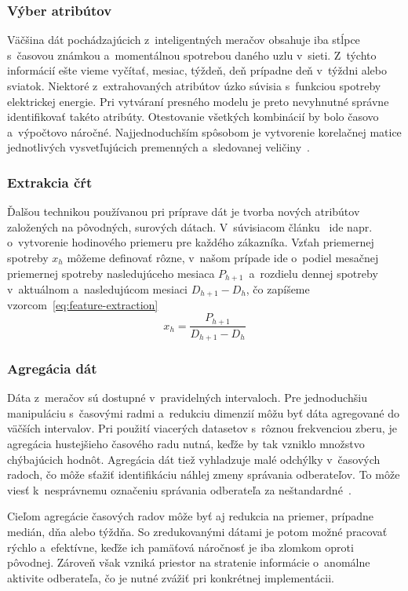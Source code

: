 \documentclass[a4paper,twoside,slovak,12pt,appendix]{article}
\begin{document}
\subsubsection{Výber atribútov}
Väčšina dát pochádzajúcich z~inteligentných meračov obsahuje iba stĺpce
s~časovou známkou a~momentálnou spotrebou daného uzlu v~sieti. Z~týchto
informácií ešte vieme vyčítať, mesiac, týždeň, deň prípadne deň v~týždni alebo
sviatok. Niektoré z~extrahovaných atribútov úzko súvisia s~funkciou spotreby
elektrickej energie. Pri vytváraní presného modelu je preto nevyhnutné správne
identifikovať takéto atribúty. Otestovanie všetkých kombinácií by bolo časovo
a~výpočtovo náročné. Najjednoduchším spôsobom je vytvorenie korelačnej matice
jednotlivých vysvetľujúcich premenných a~sledovanej veličiny~\cite{Cody2015}.

\subsubsection{Extrakcia čŕt}
Ďalšou technikou používanou pri príprave dát je tvorba nových atribútov
založených na pôvodných, surových dátach. V~súvisiacom článku~\cite{Nagi2008}
ide napr. o~vytvorenie hodinového priemeru pre každého zákazníka. Vzťah
priemernej spotreby $x_h$ môžeme definovať rôzne, v~našom prípade ide o~podiel
mesačnej priemernej spotreby nasledujúceho mesiaca $P_{h+1}$~a~rozdielu dennej
spotreby v~aktuálnom a~nasledujúcom mesiaci $D_{h+1} - D_{h}$, čo zapíšeme
vzorcom~\ref{eq:feature-extraction}
\begin{equation}
	\label{eq:feature-extraction}
  x_h = \frac{P_{h+1}}{D_{h+1} - D_{h}}
\end{equation}

\subsubsection{Agregácia dát}
Dáta z~meračov sú dostupné v~pravidelných intervaloch. Pre jednoduchšiu
manipuláciu s~časovými radmi a~redukciu dimenzií môžu byť dáta agregované do
väčších intervalov. Pri použití viacerých datasetov s~rôznou frekvenciou zberu,
je agregácia hustejšieho časového radu nutná, keďže by tak vzniklo množstvo
chýbajúcich hodnôt. Agregácia dát tiež vyhladzuje malé odchýlky v~časových
radoch, čo môže sťažiť identifikáciu náhlej zmeny správania odberateľov. To môže
viesť k~nesprávnemu označeniu správania odberateľa za
neštandardné~\cite{Cody2015}.

Cieľom agregácie časových radov môže byť aj redukcia na priemer, prípadne
medián, dňa alebo týždňa. So zredukovanými dátami je potom možné pracovať rýchlo
a~efektívne, keďže ich pamäťová náročnosť je iba zlomkom oproti pôvodnej.
Zároveň však vzniká priestor na stratenie informácie o~anomálne aktivite
odberateľa, čo je nutné zvážiť pri konkrétnej implementácii.
\end{document}
